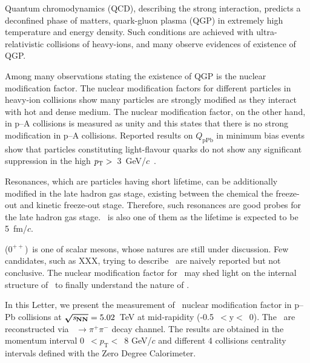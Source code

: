 \documentclass[ALICE,manyauthors]{cernphprep}
\begin{document}
%
%
%
%

Quantum chromodynamics (QCD), describing the strong interaction, predicts a deconfined phase of matters, quark-gluon plasma (QGP) in extremely high temperature and energy density. Such conditions are achieved with ultra-relativistic collisions of heavy-ions, and many observe evidences of existence of QGP.

Among many observations stating the existence of QGP is the nuclear modification factor. The nuclear modification factors for different particles in heavy-ion collisions show many particles are strongly modified as they interact with hot and dense medium. The nuclear modification factor, on the other hand, in p--A collisions is measured as unity and this states that there is no strong modification in p--A collisions. Reported results on $Q_{\mathrm{pPb}}$ in minimum bias events show that particles constituting light-flavour quarks do not show any significant suppression in the high $p_{\rm{T}}>$~3~GeV/$c$~\cite{ALICE:2016dei}.

Resonances, which are particles having short lifetime, can be additionally modified in the late hadron gas stage, existing between the chemical the freeze-out and kinetic freeze-out stage. Therefore, such resonances are good probes for the late hadron gas stage. \fzero~is also one of them as the lifetime is expected to be 5~fm/$c$.

\fzero($0^{++}$)~is one of scalar mesons, whose natures are still under discussion. Few candidates, such as XXX, trying to describe \fzero~are naively reported but not conclusive. The nuclear modification factor for \fzero~may shed light on the internal structure of \fzero~to finally understand the nature of \fzero.

In this Letter, we present the measurement of \fzero~nuclear modification factor in p--Pb collisions at $\boldsymbol{\sqrt{{\textit s_{\mathrm{NN}}}}}=5.02$~TeV at mid-rapidity (-0.5~$<\mathrm{y}<$~0). The \fzero~are reconstructed via \fzero~$\rightarrow \pi^{+}\pi^{-}$ decay channel. The results are obtained in the momentum interval 0~$<p_{\mathrm{T}}<$~8 GeV/$c$ and different 4 collisions centrality intervals defined with the Zero Degree Calorimeter. 
\end{document}
